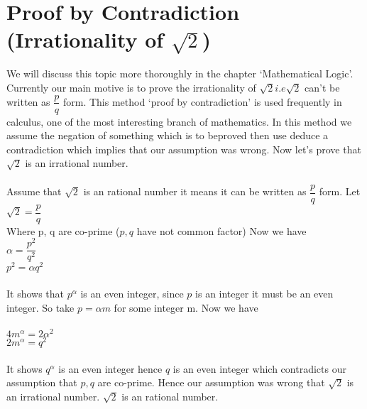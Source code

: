 \documentclass[a4paper,10pt]{article}
\begin{document}
\section{Proof by Contradiction (Irrationality of $\sqrt{2}$)}
We will discuss this topic more thoroughly in the chapter ‘Mathematical
Logic’. Currently
our main motive is to prove the irrationality of $\sqrt{2} i.e \sqrt{2}$
can’t be written as $\dfrac{p}{q}$ form. This
method ‘proof by contradiction’ is used frequently in calculus, one of
the most interesting
branch of mathematics. In this method we assume the negation of
something which is to beproved then use deduce a contradiction which
implies that our assumption was wrong. Now let’s prove that $\sqrt{2}$ is an
irrational number.\\\\
Assume that $\sqrt{2}$ is an rational number it means it can be written
as $\dfrac{p}{q}$
form. Let\\
$\sqrt{2} = \dfrac{p}{q}$\\
Where p, q are co-prime ($p, q$ have not common factor) Now we have\\
$\alpha = \dfrac{p^2}{q^2}$\\
$p^2 = \alpha q^2$\\\\
It shows that $p^\alpha$ is an even integer, since $p$ is an integer it must be
an even integer. So take $p = \alpha m$ for some integer m. Now we
have\\\\
$4 m^\alpha = 2 \alpha^2$\\
$2 m^\alpha = q^2$\\\\
It shows $q^\alpha$ is an even integer hence $q$ is an even integer which
contradicts our assumption
that $p, q$ are co-prime. Hence our assumption was wrong that
$\sqrt{2}$ is an irrational number.
$\sqrt{2}$ is an rational number.\\\\ 
\setcounter{subsection}{4}
\end{document}
